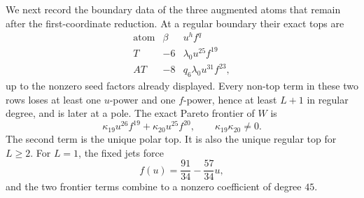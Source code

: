 \documentclass[11pt]{article}
\theoremstyle{remark}
\begin{document}
We next record the boundary data of the three augmented atoms that remain
after the first-coordinate reduction.  At a regular boundary their exact
tops are
\[
\begin{array}{c|c|c}
\text{atom}&\beta&u^hf^q\\ \hline
T&-6&\lambda_0u^{25}f^{19}\\
AT&-8&q_6\lambda_0u^{31}f^{23},
\end{array}
\tag{38}
\]
up to the nonzero seed factors already displayed.  Every non-top term
in these two rows loses at least one \(u\)-power and one \(f\)-power,
hence at least \(L+1\) in regular degree, and is later at a pole.
The exact Pareto frontier of \(W\) is
\[
\kappa_{19}u^{26}f^{19}
+\kappa_{20}u^{25}f^{20},
\qquad \kappa_{19}\kappa_{20}\ne0.
\tag{39}
\]
The second term is the unique polar top.  It is also the unique regular
top for \(L\ge2\).  For \(L=1\), the fixed jets force
\[
f(u)=\frac{91}{34}-\frac{57}{34}u,
\tag{40}
\]
and the two frontier terms combine to a nonzero coefficient of degree
\(45\).
\end{document}

